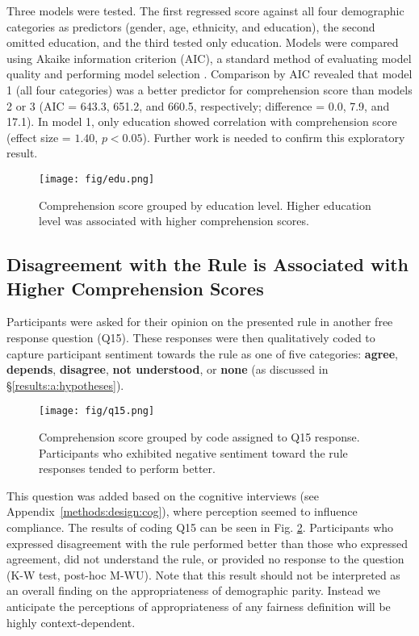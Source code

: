 \documentclass{article}
\newcommand{\Appref}[1]{Appendix~\ref{#1}}
\begin{document}
Three models were tested. The first regressed score against all four demographic categories as predictors (gender, age, ethnicity, and education), the second omitted education, and the third tested only education. Models were compared using Akaike information criterion (AIC), a standard method of evaluating model quality and performing model selection \cite{akaike1974}. Comparison by AIC revealed that model 1 (all four categories) was a better predictor for comprehension score than models 2 or 3 (AIC = 643.3, 651.2, and 660.5, respectively; difference = 0.0, 7.9, and 17.1). 
In model 1, only education showed correlation with comprehension score (effect size = $1.40$, $p<0.05$). Further work is needed to confirm this exploratory result.

\begin{figure}[ht]
    \centering
    \texttt{[image: fig/edu.png]}
    \vspace{-10pt}
    \caption{Comprehension score grouped by education level. Higher education level was associated with higher comprehension scores.}
    \label{fig:edu}
    \vspace{-10pt}
\end{figure}

\subsection{Disagreement with the Rule is Associated with Higher Comprehension Scores} \label{results:1:rq3}

Participants were asked for their opinion on the presented rule in another free response question (Q15). These responses were then qualitatively coded to capture participant sentiment towards the rule as one of five categories: \textbf{agree}, \textbf{depends}, \textbf{disagree}, \textbf{not understood}, or \textbf{none} (as discussed in \S\ref{results:a:hypotheses}).

 
\begin{figure}[ht]
    \centering
    \texttt{[image: fig/q15.png]}
    \caption{Comprehension score grouped by code assigned to Q15 response. Participants who exhibited negative sentiment toward the rule responses tended to perform better.}
    \label{fig:q15}
    \vspace{-10pt}
\end{figure}
This question was added based on the cognitive interviews (see \Appref{methods:design:cog}), where perception seemed to influence compliance.
The results of coding Q15 can be seen in Fig. \ref{fig:q15}. Participants who expressed disagreement with the rule performed better than those who expressed agreement, did not understand the rule, or provided no response to the question (K-W test, post-hoc M-WU). Note that this result should not be interpreted as an overall finding on the appropriateness of demographic parity. Instead we anticipate the perceptions of appropriateness of any fairness definition will be highly context-dependent.
\end{document}
